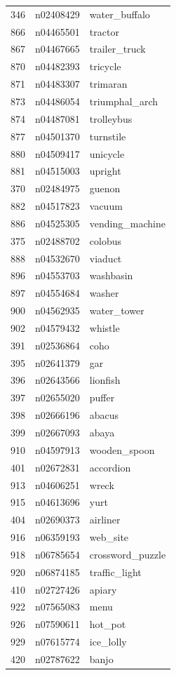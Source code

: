 \begin{table}
\begin{tabular}{cll}
346 & n02408429 & water_buffalo \\
866 & n04465501 & tractor \\
867 & n04467665 & trailer_truck \\
870 & n04482393 & tricycle \\
871 & n04483307 & trimaran \\
873 & n04486054 & triumphal_arch \\
874 & n04487081 & trolleybus \\
877 & n04501370 & turnstile \\
880 & n04509417 & unicycle \\
881 & n04515003 & upright \\
370 & n02484975 & guenon \\
882 & n04517823 & vacuum \\
886 & n04525305 & vending_machine \\
375 & n02488702 & colobus \\
888 & n04532670 & viaduct \\
896 & n04553703 & washbasin \\
897 & n04554684 & washer \\
900 & n04562935 & water_tower \\
902 & n04579432 & whistle \\
391 & n02536864 & coho \\
395 & n02641379 & gar \\
396 & n02643566 & lionfish \\
397 & n02655020 & puffer \\
398 & n02666196 & abacus \\
399 & n02667093 & abaya \\
910 & n04597913 & wooden_spoon \\
401 & n02672831 & accordion \\
913 & n04606251 & wreck \\
915 & n04613696 & yurt \\
404 & n02690373 & airliner \\
916 & n06359193 & web_site \\
918 & n06785654 & crossword_puzzle \\
920 & n06874185 & traffic_light \\
410 & n02727426 & apiary \\
922 & n07565083 & menu \\
926 & n07590611 & hot_pot \\
929 & n07615774 & ice_lolly \\
420 & n02787622 & banjo \\

\end{tabular}
\end{table}
